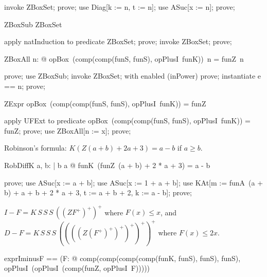 \documentclass{article}
\begin{document}
\begin{zproof}
invoke ZBoxSet;
prove;
use Diag[k := n, t := n];
use ASuc[x := n];
prove;
\end{zproof}

\begin{theorem}{ZBoxSub}
  \nat \subseteq ZBoxSet
\end{theorem}

\begin{zproof}
apply natInduction to predicate \nat \subseteq ZBoxSet;
prove;
invoke ZBoxSet;
prove;
\end{zproof}

\begin{theorem}{ZBoxAll}
  \forall n: \nat @ opBox~(comp(comp(funS, funS), opPlusI~funK))~n = funZ~n
\end{theorem}

\begin{zproof}
prove;
use ZBoxSub;
invoke ZBoxSet;
with enabled (inPower) prove;
instantiate e == n;
prove;
\end{zproof}

\begin{theorem}{ZExpr}
  opBox~(comp(comp(funS, funS), opPlusI~funK)) = funZ
\end{theorem}

\begin{zproof}
apply UFExt to predicate opBox~(comp(comp(funS, funS), opPlusI~funK)) = funZ;
prove;
use ZBoxAll[n := x];
prove;
\end{zproof}

Robinson's formula: $K(Z(a+b) + 2a + 3) = a - b$ if $a \ge b$.

\begin{theorem}{RobDiffK}
  \forall a, b: \nat | b \leq a @ funK~(funZ~(a + b) + 2 * a + 3) = a - b
\end{theorem}

\begin{zproof}
prove;
use ASuc[x := a + b];
use ASuc[x := 1 + a + b];
use KAt[m := funA~(a + b) + a + b + 2 * a + 3, t := a + b + 2, k := a - b];
prove;
\end{zproof}

$I - F = K\,S\,S\,S\,((Z F^+)^+)^+$ where $F(x) \le x$, and
$D - F = K\,S\,S\,S\,((((Z (F^+)^+)^+)^+)^+)^+$ where $F(x) \le 2x$.

\begin{zed}
  exprIminusF == (\lambda F: \nat \fun \nat @ comp(comp(comp(comp(funK, funS), funS), funS), opPlusI~(opPlusI~(comp(funZ, opPlusI~F)))))
\end{zed}
\end{document}
